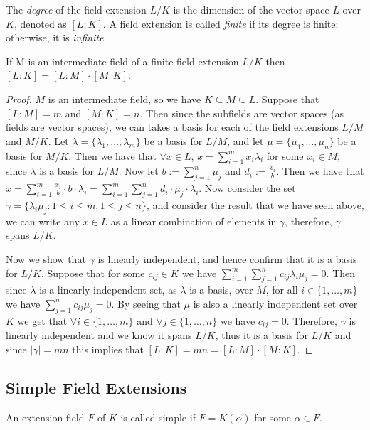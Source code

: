 \begin{definition}
    The \textit{degree} of the field extension $L/K$ is the dimension of the vector space $L$ over $K$, denoted as $[L:K]$.
    A field extension is called \textit{finite} if its degree is finite; otherwise, it is \textit{infinite}. 
\end{definition}
\begin{theorem} \label{thm:tower-theorem}
    If M is an intermediate field of a finite field extension $L/K$ then
$
    [L:K] = [L:M]\cdot[M:K]
$. 
\end{theorem}
\begin{proof}
$M$ is an intermediate field, so we have $K \subseteq M \subseteq L$. Suppose that $[L:M]=m$ and $[M:K]=n$. Then since the subfields are vector spaces (as fields are vector spaces), we can takes a basis for each of the field extensions $L/M$ and $M/K$.
Let $\lambda = \{\lambda_1,\dots,\lambda_m\}$ be a basis for $L/M$, and let $\mu = \{\mu_1,\dots,\mu_n\}$ be a basis for $M/K$. Then we have that $\forall x \in L$, $x = \sum^m_{i=1}x_i\lambda_i$ for some $x_i \in M$, since $\lambda$ is a basis for $L/M$. Now let $b:=\sum^n_{j=1}\mu_j$ and $d_i:=\frac{x_i}{b}$. Then we have that $x=\sum^m_{i=1}\frac{x_i}{b}\cdot b \cdot \lambda_i = \sum^m_{i=1}\sum^n_{j=1}d_i\cdot \mu_j \cdot \lambda_i$. Now consider the set $\gamma=\{\lambda_i\mu_j : 1\leq i \leq m, 1\leq j \leq n\}$, and consider the result that we have seen above, we can write any $x \in L$ as a linear combination of elements in $\gamma$, therefore, $\gamma$ spans $L/K$.

Now we show that $\gamma$ is linearly independent, and hence confirm that it is a basis for $L/K$. Suppose that for some $c_{ij} \in K$ we have $\sum^m_{i=1} \sum^n_{j=1} c_{ij}\lambda_i\mu_j = 0 $. Then since $\lambda$ is a linearly independent set, as $\lambda$ is a basis, over $M$, for all $i \in \{1,\dots,m\}$ we have $\sum^n_{j=1} c_{ij}\mu_j = 0 $. By seeing that $\mu$ is also a linearly independent set over $K$ we get that $\forall i \in \{1,\dots,m\}$ and $\forall j \in \{1,\dots,n\}$ we have $c_{ij} = 0$. Therefore, $\gamma$ is linearly independent and we  know it spans $L/K$, thus it is a basis for $L/K$ and since $|\gamma|=mn$ this implies that $[L:K] = mn = [L:M]\cdot[M:K]$.
\end{proof}

\subsection{Simple Field Extensions}
\begin{definition}
An extension field \(F\) of \(K\) is called simple if \(F = K(\alpha)\) for some \(\alpha \in F\).
\end{definition}

